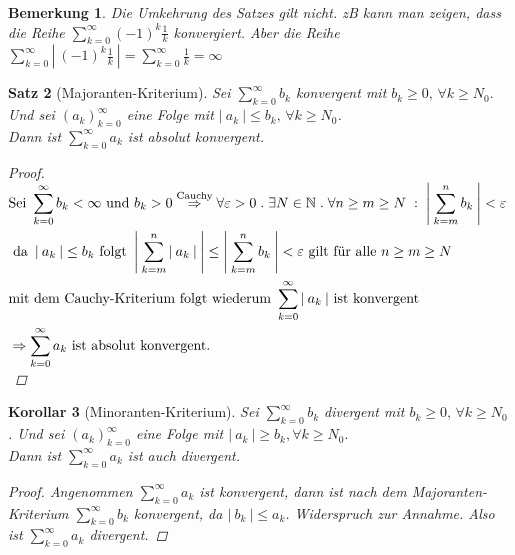 \documentclass[a4paper,titlepage,oneside]{article}
\def\N{\ensuremath{\mathbb{N}} }
\renewcommand{\epsilon}{\ensuremath{\varepsilon} }
\def\sp{\hspace{0,1cm}}
\def\spdot{\sp.\sp}
\def\spcolon{\sp:\sp}
\newcommand{\suminf}[2][n]{\ensuremath{\sum_{#1= 0}^{\infty}{#2}}}
\newcommand{\abs}[1]{\ensuremath{\left|\:#1\:\right|}}
\theoremstyle{thmstyle}
\newtheorem{satz}{Satz}[section]
\newtheorem{korr}[satz]{Korollar}
\newtheorem{bem}[satz]{Bemerkung}
\theoremstyle{subthmstyle}
\begin{document}
\begin{bem}
Die Umkehrung des Satzes gilt nicht. zB kann man zeigen, dass die Reihe $  \displaystyle \suminf[k]{(-1)^k\frac{1}{k}}$ konvergiert. Aber die Reihe $ \displaystyle \suminf[k]{\abs{(-1)^k\frac{1}{k}}} = \suminf[k]{\frac{1}{k}} = \infty$
\end{bem}

\begin{satz}[Majoranten-Kriterium]
Sei $ \displaystyle \suminf[k]{b_k}$ konvergent mit $ b_k \ge 0,\, \forall k \ge N_0.$ Und sei $ \displaystyle (a_k)_{k=0}^{\infty} $ eine Folge mit $ \abs{a_k} \le b_k ,\, \forall k \ge N_0$.\\
Dann ist $ \displaystyle \suminf[k]{a_k} $ ist absolut konvergent.
\begin{proof}
\begin{math}\displaystyle \begin{aligned}[t]
&\text{Sei } \suminf[k]{b_k} < \infty \text{ und } b_k > 0 \overset{\text{Cauchy}}{\Rightarrow} \forall \epsilon > 0 \spdot \exists N \in \N \spdot \forall n \ge m \ge N \spcolon \abs{\sum_{k=m}^{n}{b_k}} < \epsilon \\
&\text{ da } \abs{a_k} \le b_k \text{ folgt } \abs{\sum_{k=m}^{n}{\abs{a_k}}} \le \abs{\sum_{k=m}^{n}{b_k}} < \epsilon \text{ gilt für alle } n \ge m \ge N \\
&\text{mit dem Cauchy-Kriterium folgt wiederum } \suminf[k]{\abs{a_k}} \text{ ist konvergent} \\
&\Rightarrow \suminf[k]{a_k}\text{ ist absolut konvergent.}
\end{aligned}\\\end{math} 
\end{proof}
\end{satz}

\begin{korr}[Minoranten-Kriterium]
Sei $ \displaystyle \suminf[k]{b_k} $ divergent mit $b_k \ge 0 ,\, \forall k \ge N_0 $. Und sei $ \displaystyle  (a_k)_{k=0}^{\infty} $ eine Folge mit $ \abs{a_k} \ge b_k , \forall k \ge N_0.$\\
Dann ist $ \displaystyle \suminf[k]{a_k} $ ist auch divergent.
\begin{proof}
Angenommen $\displaystyle \suminf[k]{a_k}$ ist konvergent, dann ist nach dem Majoranten-Kriterium $\displaystyle \suminf[k]{b_k}$ konvergent, da $\displaystyle \abs{b_k} \le a_k$. Widerspruch zur Annahme. Also ist $\displaystyle \suminf[k]{a_k}$  divergent.
\end{proof}
\end{korr}
\end{document}
